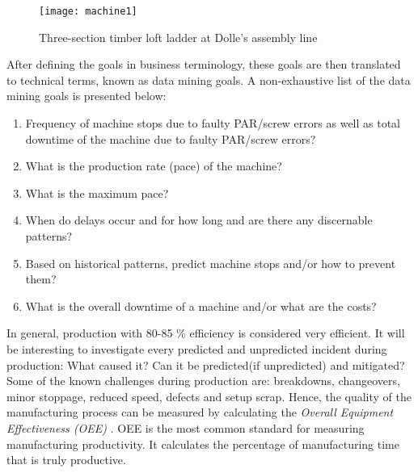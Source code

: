 \documentclass[runningheads]{llncs}
\begin{document}
\begin{figure}
\centering
\texttt{[image: machine1]}
\caption{Three-section timber loft ladder at Dolle's assembly line}
\label{fig:ladder1}
\end{figure}

After defining the goals in business terminology, these goals are then translated to technical terms, known as data mining goals. A non-exhaustive list of the data mining goals is presented below:
\begin{enumerate} 
\item Frequency of machine stops due to faulty PAR/screw errors as well as total downtime of the machine due to faulty PAR/screw errors?
\item What is the production rate (pace) of the machine?
\item What is the maximum pace?
\item When do delays occur and for how long and are there any discernable patterns?
\item Based on historical patterns, predict machine stops and/or how to prevent them?
\item What is the overall downtime of a machine and/or what are the costs?
\end{enumerate} 


In general, production with 80-85 \% efficiency is considered very efficient. It will be interesting to investigate every predicted and unpredicted incident during production: What caused it? Can it be predicted(if unpredicted) and mitigated? Some of the known challenges during production are: breakdowns, changeovers, minor stoppage, reduced speed, defects and setup scrap. Hence, the quality of the manufacturing process can be measured by calculating the \textit{Overall Equipment Effectiveness (OEE)} \cite{oee}. OEE is the most common standard for measuring manufacturing productivity. It calculates the percentage of manufacturing time that is truly productive. 
\end{document}
